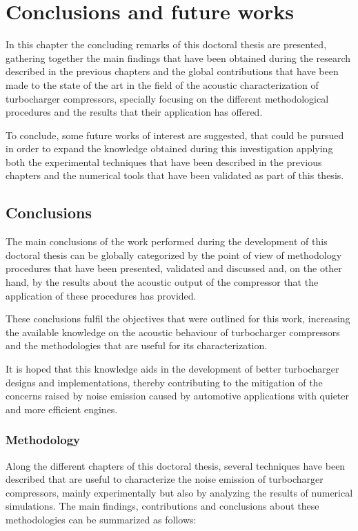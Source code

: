\chapter{Conclusions and future works}
\label{cap:conclus}

In this chapter the concluding remarks of this doctoral thesis are presented, gathering together the main findings that have been obtained during the research described in the previous chapters and the global contributions that have been made to the state of the art in the field of the acoustic characterization of turbocharger compressors, specially focusing on the different methodological procedures and the results that their application has offered.

To conclude, some future works of interest are suggested, that could be pursued in order to expand the knowledge obtained during this investigation applying both the experimental techniques that have been described in the previous chapters and the numerical tools that have been validated as part of this thesis.

\section{Conclusions}

The main conclusions of the work performed during the development of this doctoral thesis can be globally categorized by the point of view of methodology procedures that have been presented, validated and discussed and, on the other hand, by the results about the acoustic output of the compressor that the application of these procedures has provided.

These conclusions fulfil the objectives that were outlined for this work, increasing the available knowledge on the acoustic behaviour of turbocharger compressors and the methodologies that are useful for its characterization.

It is hoped that this knowledge aids in the development of better turbocharger designs and implementations, thereby contributing to the mitigation of the concerns raised by noise emission caused by automotive applications with quieter and more efficient engines.

\subsection{Methodology}

Along the different chapters of this doctoral thesis, several techniques have been described that are useful to characterize the noise emission of turbocharger compressors, mainly experimentally but also by analyzing the results of numerical simulations. The main findings, contributions and conclusions about these methodologies can be summarized as follows: 

